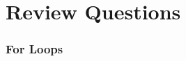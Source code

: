\documentclass{book}
\begin{document}
    




    
        \hypertarget{review-questions}{%
\section{Review Questions}\label{review-questions}}
    




    
        \hypertarget{for-loops}{%
\subsubsection{For Loops}\label{for-loops}}
    
\end{document}
